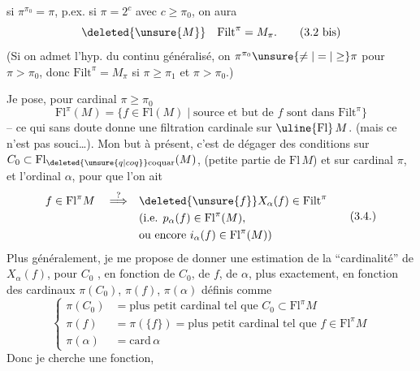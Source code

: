  si $\pi^{\pi_0}=\pi$, p.ex. si $\pi=2^c$ avec $c\geq\pi_0$, on aura
\[
\deleted{\unsure{M}}\quad\mathrm{Filt}^{\pi}=M_\pi.\tag*{(3.2 bis)}
\]
(Si on admet l'hyp. du continu généralisé, on  $\pi^{\pi_0}\unsure{\ne|=|\geq}\pi$ pour  $\pi>\pi_0$, donc $\mathrm{Filt}^{\pi}=M_\pi$ si $\pi\geq\pi_1$ et $\pi>\pi_0$.)


Je pose, pour  cardinal $\pi\geq\pi_0$
\[
\mathrm{Fl}^{\pi}(M)=\{f\in\mathrm{Fl}(M)\mid\text{source et but de }f\text{ sont dans }\mathrm{Filt}^{\pi}\}\tag*{(3.3.)}
\]
-- ce qui sans doute donne une filtration cardinale sur $\uline{\mathrm{Fl}}\,M$. (mais ce n'est pas  souci\ldots). Mon but à présent, c'est de dégager des conditions sur $C_0\subset\mathrm{Fl}_{\deleted{\unsure{q|coq}}\mathrm{coquar}}(M)$, (petite partie de $\mathrm{Fl}\,M$) et sur  cardinal $\pi$, et l'ordinal $\alpha$, pour que l'on ait
\[
\begin{aligned}
f\in\mathrm{Fl}^{\pi}M\quad\overset{?}{\Longrightarrow}\quad&\deleted{\unsure{f}}X_\alpha(f)\in\mathrm{Filt}^{\pi}\\
&\text{(i.e. }p_\alpha(f)\in\mathrm{Fl}^{\pi}(M),\\
&\text{ou encore }i_\alpha(f)\in\mathrm{Fl}^{\pi}(M)\text{)}
\end{aligned}\tag*{(3.4.)}
\]
Plus généralement, je me propose de donner une  estimation de la ``cardinalité'' de $X_\alpha(f)$, pour $C_0$ , en fonction de $C_0$, de $f$, de $\alpha$, plus exactement, en fonction des  cardinaux $\pi(C_0)$, $\pi(f)$, $\pi(\alpha)$ définis comme
\[
\left\{\begin{aligned}
\pi(C_0)&=\text{plus petit cardinal tel que }C_0\subset\mathrm{Fl}^{\pi}M\\
\pi(f)&=\pi(\{f\})=\text{plus petit cardinal tel que }f\in\mathrm{Fl}^{\pi}M\\
\pi(\alpha)&=\mathrm{card}\,\alpha
\end{aligned}\right.\tag*{3.5.}
\]
Donc je cherche une fonction,
